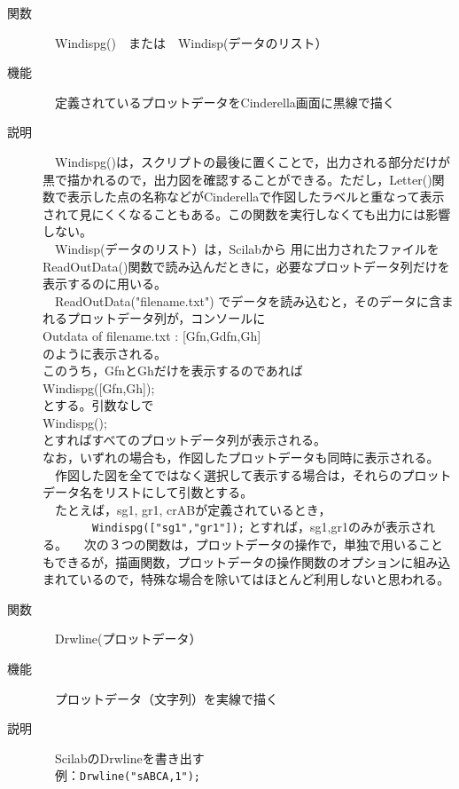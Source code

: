 \documentclass[papersize,a4paper,12pt,uplatex]{jsarticle}
\begin{document}
\begin{description}
\hypertarget{windispg}{}
\item[関数]　Windispg()　または　Windisp(データのリスト）
\item[機能]　定義されているプロットデータをCinderella画面に黒線で描く
\item[説明]　Windispg()は，スクリプトの最後に置くことで，出力される部分だけが黒で描かれるので，出力図を確認することができる。ただし，Letter()関数で表示した点の名称などがCinderellaで作図したラベルと重なって表示されて見にくくなることもある。この関数を実行しなくても出力には影響しない。\\
　Windisp(データのリスト）は，Scilabから \ketcindy 用に出力されたファイルを ReadOutData()関数で読み込んだときに，必要なプロットデータ列だけを表示するのに用いる。\\
　ReadOutData("filename.txt") でデータを読み込むと，そのデータに含まれるプロットデータ列が，コンソールに\\
Outdata of filename.txt : [Gfn,Gdfn,Gh] \\
のように表示される。\\
このうち，GfnとGhだけを表示するのであれば\\
Windispg([Gfn,Gh]);\\
 とする。引数なしで\\
Windispg();\\
とすればすべてのプロットデータ列が表示される。\\
なお，いずれの場合も，作図したプロットデータも同時に表示される。\\
　作図した図を全てではなく選択して表示する場合は，それらのプロットデータ名をリストにして引数とする。\\
　たとえば，sg1, gr1, crABが定義されているとき，\\
　　　　\verb|Windispg(["sg1","gr1"]);|
とすれば，sg1,gr1のみが表示される。
　次の３つの関数は，プロットデータの操作で，単独で用いることもできるが，描画関数，プロットデータの操作関数のオプションに組み込まれているので，特殊な場合を除いてはほとんど利用しないと思われる。\\

\hypertarget{drwline}{}
\item[関数]　Drwline(プロットデータ）
\item[機能]　プロットデータ（文字列）を実線で描く
\item[説明]　ScilabのDrwlineを書き出す\\
　例：\verb|Drwline("sABCA,1");|\\
\\


\end{description}
\end{document}

